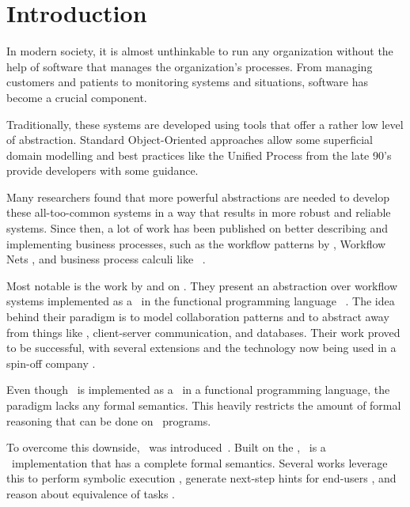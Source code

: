 
\section{Introduction}
\label{sec:introduction}

In modern society, it is almost unthinkable to run any organization without the help of software that manages the organization's processes.
From managing customers and patients to monitoring systems and situations, software has become a crucial component.

Traditionally, these systems are developed using tools that offer a rather low level of abstraction.
Standard Object-Oriented approaches allow some superficial domain modelling and best practices like the Unified Process from the late 90's provide developers with some guidance.

Many researchers found that more powerful abstractions are needed to develop these all-too-common systems in a way that results in more robust and reliable systems.
Since then, a lot of work has been published on better describing and implementing business processes,
such as the workflow patterns by \citeauthor{journals/dpd/AalstHKB03}, Workflow Nets \cite{journals/jcsc/Aalst98}, and business process calculi like \BPEL\ \cite{bpel}.

Most notable is the work by \citet{conf/ifl/KoopmanPA08} and \citet{conf/ppdp/PlasmeijerLMAK12} on \ITASKS.
They present an abstraction over workflow systems implemented as a \DSL\ in the functional programming language \CLEAN\ \cite{plasmeijer2002clean}.
The idea behind their paradigm is to model collaboration patterns
and to abstract away from things like \GUI, client-server communication, and databases.
Their work proved to be successful, with several extensions and the technology now being used in a spin-off company \cite{com/tss/viia}.

Even though \ITASKS\ is implemented as a \DSL\ in a functional programming language, the paradigm lacks any formal semantics.
This heavily restricts the amount of formal reasoning that can be done on \ITASKS\ programs.

To overcome this downside, \TOPHAT\ was introduced~\cite{conf/ppdp/SteenvoordenNK19}.
Built on the \STLC,
\TOPHAT\ is a \TOP\ implementation that has a complete formal semantics.
Several works leverage this to perform symbolic execution \cite{conf/ifl/NausSK19},
generate next-step hints for end-users \cite{conf/sfp/NausS20},
and reason about equivalence of tasks \cite{conf/sfp/KlijnsmaS22}.

